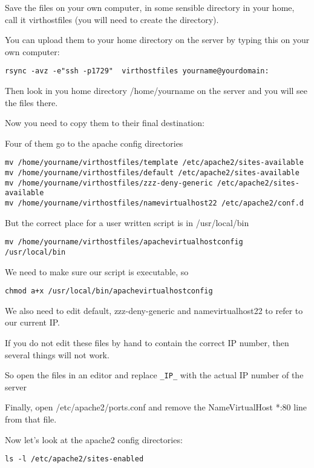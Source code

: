 \documentclass[12pt, a4paper]{article}
\begin{document}
Save the files on your own computer, in some sensible directory in your home, call it virthostfiles (you will need to create the directory).


You can upload them to your home directory on the server by typing this on your own computer:

\begin{verbatim}
rsync -avz -e"ssh -p1729"  virthostfiles yourname@yourdomain: 
\end{verbatim}



Then look in you home directory /home/yourname on the server and you will see the files there.

Now you need to copy them to their final destination:

Four of them go to the apache config directories
\begin{verbatim}
mv /home/yourname/virthostfiles/template /etc/apache2/sites-available
mv /home/yourname/virthostfiles/default /etc/apache2/sites-available
mv /home/yourname/virthostfiles/zzz-deny-generic /etc/apache2/sites-available
mv /home/yourname/virthostfiles/namevirtualhost22 /etc/apache2/conf.d 
\end{verbatim}


But the correct place for a user written script is in /usr/local/bin

\begin{verbatim}
mv /home/yourname/virthostfiles/apachevirtualhostconfig  /usr/local/bin 
\end{verbatim}


We need to make sure our script is executable, so

\begin{verbatim}
chmod a+x /usr/local/bin/apachevirtualhostconfig 
\end{verbatim}


We also need to edit default, zzz-deny-generic and namevirtualhost22 to refer to our current IP.

If you do not edit these files by hand to contain the correct IP number, then several things will not work. 

So open the files in an editor and replace \verb|_IP_| with the actual IP number of the server

Finally, open /etc/apache2/ports.conf and remove the NameVirtualHost *:80 line from that file.

Now let’s look at the apache2 config directories:

\begin{verbatim}
ls -l /etc/apache2/sites-enabled 
\end{verbatim}
\end{document}
